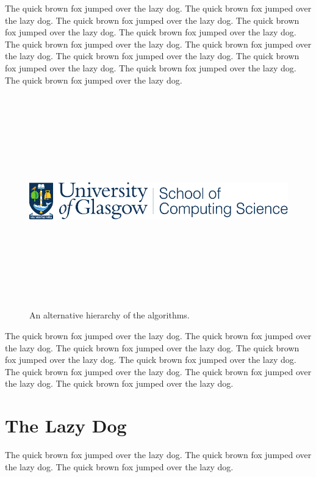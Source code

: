 \documentclass{l4proj}
\begin{document}
The quick brown fox jumped over the lazy dog.
The quick brown fox jumped over the lazy dog.
The quick brown fox jumped over the lazy dog.
The quick brown fox jumped over the lazy dog.
The quick brown fox jumped over the lazy dog.
The quick brown fox jumped over the lazy dog.
The quick brown fox jumped over the lazy dog.
The quick brown fox jumped over the lazy dog.
The quick brown fox jumped over the lazy dog.
The quick brown fox jumped over the lazy dog.
The quick brown fox jumped over the lazy dog.

\begin{figure}
\centering
\includegraphics[height=9.2cm,width=13.2cm]{images/CompSci_colour.pdf}
\vspace{-30mm}
\caption{An alternative hierarchy of the algorithms.}
\label{uroborus}
\end{figure}

The quick brown fox jumped over the lazy dog.
The quick brown fox jumped over the lazy dog.
The quick brown fox jumped over the lazy dog.
The quick brown fox jumped over \cite{ckt} the lazy dog.
The quick brown fox jumped over the lazy dog.
The quick brown fox jumped over the lazy dog.
The quick brown fox jumped over the lazy dog.
The quick brown fox jumped over the lazy dog.

\section{The Lazy Dog}
The quick brown fox jumped over the lazy dog.
The quick brown fox jumped over the lazy dog.
The quick brown fox jumped over the lazy dog.
\end{document}
